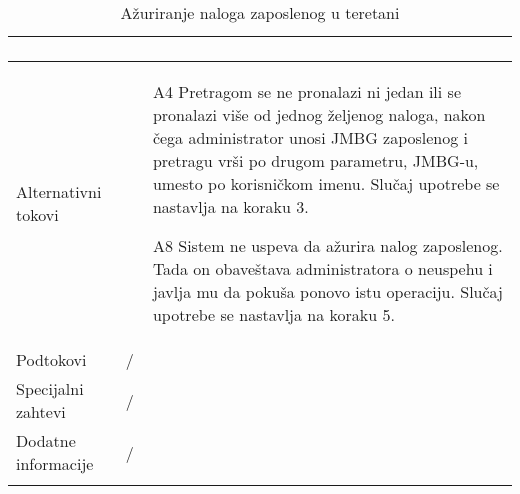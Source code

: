 \documentclass[../main.tex]{subfiles}
\begin{document}
\begin{longtable}{| p{} | p{} |}
\begin{enumerate}
    \end{enumerate}\\
\hline
    Alternativni tokovi & \begin{itemize}
        \item[A4]  Pretragom se ne pronalazi ni jedan ili se pronalazi više od jednog željenog naloga, nakon čega administrator unosi JMBG zaposlenog i pretragu vrši po drugom parametru, JMBG-u, umesto po korisničkom imenu. Slučaj upotrebe se nastavlja na koraku 3.
        \item[A8]  Sistem ne uspeva da ažurira nalog zaposlenog. Tada on obaveštava administratora o neuspehu i javlja mu da pokuša ponovo istu operaciju. Slučaj upotrebe se nastavlja na koraku 5.

    \end{itemize}\\
\hline
    Podtokovi & /\\
\hline
    Specijalni zahtevi & /\\
\hline
    Dodatne informacije & /\\
\hline
\caption{Ažuriranje naloga zaposlenog u teretani} %
\end{longtable}
\end{document}
